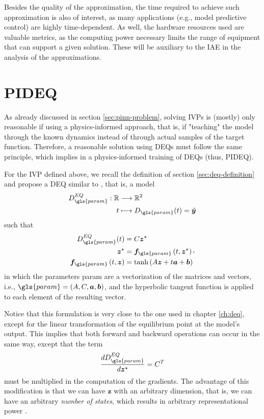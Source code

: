 Besides the quality of the approximation, the time required to achieve such approximation is also of interest, as many applications (e.g., model predictive control) are highly time-dependent.
As well, the hardware resources used are valuable metrics, as the computing power necessary limits the range of equipment that can support a given solution.
These will be auxiliary to the \gls{IAE} in the analysis of the approximations.

\section{PIDEQ}

As already discussed in section \ref{sec:pinn-problem}, solving \gls{IVP}s is (mostly) only reasonable if using a physics-informed approach, that is, if "teaching" the model through the known dynamics instead of through actual samples of the target function.
Therefore, a reasonable solution using \gls{DEQ}s must follow the same principle, which implies in a physics-informed training of \gls{DEQ}s (thus, \gls{PIDEQ}).

For the \gls{IVP} defined above, we recall the definition of section \ref{sec:deq-definition} and propose a \gls{DEQ} similar to \textcite{Ghaoui2019}, that is, a model
\begin{align*}
    D_{\gls{param}}^{EQ}: \R &\longrightarrow \R^2 \\
    t &\longmapsto D_{\gls{param}}(t) = \hat{\bm{y}}
\end{align*}
such that
\begin{equation}
\begin{split}
    D^{EQ}_{\gls{param}}(t) &= C\bm{z}^{\star} \\
    \bm{z}^{\star} &= \bm{f}_{\gls{param}}\left( t,\bm{z}^{\star} \right) \\
    \bm{f}_{\gls{param}}\left( t,\bm{z} \right) &= \tanh \left( A\bm{z} + t\bm{a} + \bm{b} \right)
\end{split}
,\end{equation}
in which the parameters \gls{param} are a vectorization of the matrices and vectors, i.e., $\gls{param} = \left( A,C,\bm{a},\bm{b} \right)$, and the hyperbolic tangent function is applied to each element of the resulting vector.

Notice that this formulation is very close to the one used in chapter \ref{ch:deq}, except for the linear transformation of the equilibrium point at the model's output.
This implies that both forward and backward operations can occur in the same way, except that the term  \[
    \frac{d D^{EQ}_{\gls{param}}}{d \bm{z}^{\star}} = C^T
\] must be multiplied in the computation of the gradients.
The advantage of this modification is that we can have $\bm{z}$ with an arbitrary dimension, that is, we can have an arbitrary \emph{number of states}, which results in arbitrary representational power \cite{Ghaoui2019}.

